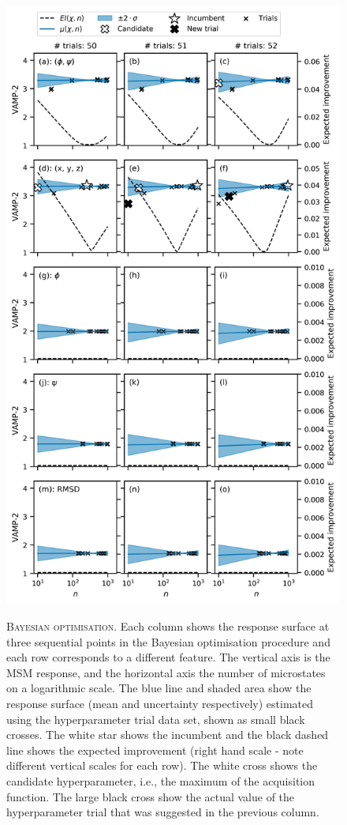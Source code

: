 \begin{figure}[p]
    \centering
    \caption[Bayesian optimisation]{\textsc{Bayesian optimisation}. Each column shows the response surface at three sequential points in the Bayesian optimisation procedure and each row corresponds to a different feature. The vertical axis is the MSM response, and the horizontal axis the number of microstates on a logarithmic scale. The blue line and shaded area show the response surface (mean and uncertainty respectively) estimated using the hyperparameter trial data set, shown as small black crosses. The white star shows the incumbent and the black dashed line shows the expected improvement (right hand scale - note different vertical scales for each row). The white cross shows the candidate hyperparameter, i.e., the maximum of the acquisition function. The large black cross show the actual value of the hyperparameter trial that was suggested in the previous column.}
    \includegraphics[height=0.75\textheight]{chapters/msm_optimization/figures/ala1_opt_explainer.png}
    \label{fig:msm_opt_explainer}
\end{figure}

